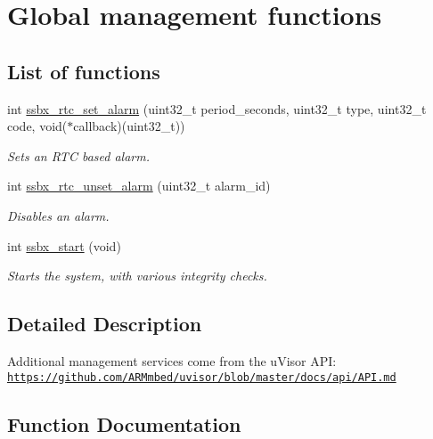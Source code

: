 \hypertarget{group__ssbx___main}{}\section{Global management functions}
\label{group__ssbx___main}
\subsection*{List of functions}
\begin{DoxyCompactItemize}
\item
int \hyperlink{group__ssbx___main_ga242681afc2ef11a1ecff51d1fecefd2b}{ssbx\+\_\+rtc\+\_\+set\+\_\+alarm} (uint32\+\_\+t period\+\_\+seconds, uint32\+\_\+t type, uint32\+\_\+t code, void($\ast$callback)(uint32\+\_\+t))
\begin{DoxyCompactList}\small\item\em Sets an R\+TC based alarm. \end{DoxyCompactList}\item
int \hyperlink{group__ssbx___main_gacbaeac49c40f20084b80c4d6b942a331}{ssbx\+\_\+rtc\+\_\+unset\+\_\+alarm} (uint32\+\_\+t alarm\+\_\+id)
\begin{DoxyCompactList}\small\item\em Disables an alarm. \end{DoxyCompactList}\item
int \hyperlink{group__ssbx___main_gabade948f2d1354f81824d6dc2ea93d83}{ssbx\+\_\+start} (void)
\begin{DoxyCompactList}\small\item\em Starts the system, with various integrity checks. \end{DoxyCompactList}\end{DoxyCompactItemize}


\subsection{Detailed Description}
Additional management services come from the u\+Visor A\+PI\+: \href{https://github.com/ARMmbed/uvisor/blob/master/docs/api/API.md}{\tt https\+://github.\+com/\+A\+R\+Mmbed/uvisor/blob/master/docs/api/\+A\+P\+I.\+md}

\subsection{Function Documentation}
\hypertarget{group__ssbx___main_ga242681afc2ef11a1ecff51d1fecefd2b}{}\label{group__ssbx___main_ga242681afc2ef11a1ecff51d1fecefd2b}
